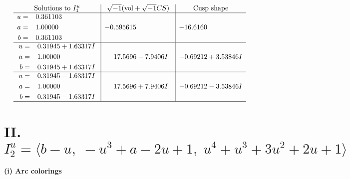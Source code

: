 \documentclass[1p]{elsarticle_modified}
\theoremstyle{definition}
\newcommand{\I}{\sqrt{-1}}
\begin{document}
$$\begin{array}{c|c|c}  
\text{Solutions to }I^u_{1}& \I (\text{vol} + \sqrt{-1}CS) & \text{Cusp shape}\\
 \hline 
\begin{aligned}
u &= \phantom{-}0.361103\phantom{ +0.000000I} \\
a &= \phantom{-}1.00000\phantom{ +0.000000I} \\
b &= \phantom{-}0.361103\phantom{ +0.000000I}\end{aligned}
 & -0.595615\phantom{ +0.000000I} & -16.6160\phantom{ +0.000000I} \\ \hline\begin{aligned}
u &= \phantom{-}0.31945 + 1.63317 I \\
a &= \phantom{-}1.00000\phantom{ +0.000000I} \\
b &= \phantom{-}0.31945 + 1.63317 I\end{aligned}
 & \phantom{-}17.5696 - 7.9406 I & -0.69212 + 3.53846 I \\ \hline\begin{aligned}
u &= \phantom{-}0.31945 - 1.63317 I \\
a &= \phantom{-}1.00000\phantom{ +0.000000I} \\
b &= \phantom{-}0.31945 - 1.63317 I\end{aligned}
 & \phantom{-}17.5696 + 7.9406 I & -0.69212 - 3.53846 I\\
 \hline 
 \end{array}$$\newpage\newpage\renewcommand{\arraystretch}{1}
\centering \section*{II. $I^u_{2}= \langle b- u,\;- u^3+a-2 u+1,\;u^4+u^3+3 u^2+2 u+1 \rangle$}
\flushleft \textbf{(i) Arc colorings}\\
\end{document}
